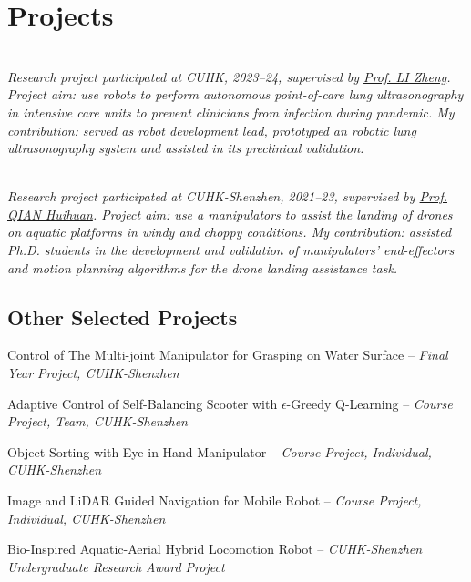 \documentclass[11pt,letterpaper]{report}
\newcommand{\listitemspace}{0.25em}
\renewenvironment{itemize}
{\begin{list}{}{\setlength{\leftmargin}{0em}
			\setlength{\parskip}{0em}
			\setlength{\itemsep}{\listitemspace}
			\setlength{\parsep}{\listitemspace}}}
	{\end{list}}
\begin{document}
\section*{Projects}
\begin{tablist}
	\item[Autonomous Robotic Lung Ultrasonography] \tab 
	\vspace{-0.8em}\\
	\textit{Research project participated at CUHK, 2023--24, supervised by \href{https://www.surgery.cuhk.edu.hk/profile.asp?alias=zli}{Prof. LI Zheng}. Project aim: use robots to perform autonomous point-of-care lung ultrasonography in intensive care units to prevent clinicians from infection during pandemic.
	My contribution: served as robot development lead, prototyped an robotic lung ultrasonography system and assisted in its preclinical validation. }
	
	\item[Manipulator-Assisted Drone Landing on Dirsturbed Aquatic Platform]\tab 
	\vspace{-0.8em}\\
	\textit{Research project participated at CUHK-Shenzhen, 2021--23, supervised by \href{https://sse.cuhk.edu.cn/en/faculty/qianhuihuan}{Prof. QIAN Huihuan}. Project aim: use a manipulators to assist the landing of drones on aquatic platforms in windy and choppy conditions. My contribution: assisted Ph.D. students in the development and validation of manipulators' end-effectors and motion planning algorithms for the drone landing assistance task.} 
\end{tablist}
\subsection*{Other Selected Projects}
\begin{itemize}
	\item Control of The Multi-joint Manipulator for Grasping on Water Surface -- \textit{Final Year Project, CUHK-Shenzhen}
	
	\item Adaptive Control of Self-Balancing Scooter with $\epsilon$-Greedy Q-Learning -- \textit{Course Project, Team, CUHK-Shenzhen}
	
	\item Object Sorting with Eye-in-Hand Manipulator -- \textit{Course Project, Individual, CUHK-Shenzhen}
	
	\item Image and LiDAR Guided Navigation for Mobile Robot --
	\textit{Course Project, Individual, CUHK-Shenzhen}
	
	\item Bio-Inspired Aquatic-Aerial Hybrid Locomotion Robot -- \textit{CUHK-Shenzhen Undergraduate Research Award Project}
\end{itemize}
\end{document}
